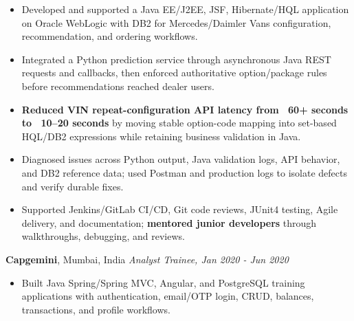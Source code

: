 \documentclass[11pt,letterpaper]{article}
\begin{document}
\begin{itemize}
  \item Developed and supported a Java EE/J2EE, JSF, Hibernate/HQL application on Oracle WebLogic with DB2 for Mercedes/Daimler Vans configuration, recommendation, and ordering workflows.
  \item Integrated a Python prediction service through asynchronous Java REST requests and callbacks, then enforced authoritative option/package rules before recommendations reached dealer users.
  \item \textbf{Reduced VIN repeat-configuration API latency from ~60+ seconds to ~10--20 seconds} by moving stable option-code mapping into set-based HQL/DB2 expressions while retaining business validation in Java.
  \item Diagnosed issues across Python output, Java validation logs, API behavior, and DB2 reference data; used Postman and production logs to isolate defects and verify durable fixes.
  \item Supported Jenkins/GitLab CI/CD, Git code reviews, JUnit4 testing, Agile delivery, and documentation; \textbf{mentored junior developers} through walkthroughs, debugging, and reviews.
\end{itemize}
\textbf{Capgemini}, Mumbai, India \hfill \textit{Analyst Trainee, Jan 2020 - Jun 2020}
\begin{itemize}
  \item Built Java Spring/Spring MVC, Angular, and PostgreSQL training applications with authentication, email/OTP login, CRUD, balances, transactions, and profile workflows.
\end{itemize}
\end{document}
